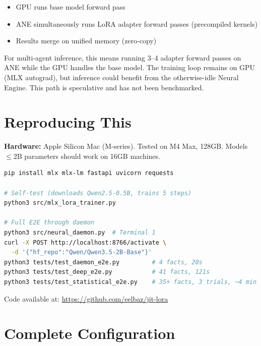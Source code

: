 \documentclass[11pt,a4paper]{article}
\begin{document}
\begin{itemize}[noitemsep]
    \item GPU runs base model forward pass
    \item ANE simultaneously runs LoRA adapter forward passes (precompiled kernels)
    \item Results merge on unified memory (zero-copy)
\end{itemize}

For multi-agent inference, this means running 3--4 adapter forward passes on ANE while the GPU handles the base model. The training loop remains on GPU (MLX autograd), but inference could benefit from the otherwise-idle Neural Engine. This path is speculative and has not been benchmarked.

\section{Reproducing This}

\textbf{Hardware:} Apple Silicon Mac (M-series). Tested on M4 Max, 128GB. Models $\leq$2B parameters should work on 16GB machines.

\begin{lstlisting}[language=bash, numbers=none]
pip install mlx mlx-lm fastapi uvicorn requests

# Self-test (downloads Qwen2.5-0.5B, trains 5 steps)
python3 src/mlx_lora_trainer.py

# Full E2E through daemon
python3 src/neural_daemon.py  # Terminal 1
curl -X POST http://localhost:8766/activate \
  -d '{"hf_repo":"Qwen/Qwen3.5-2B-Base"}'
python3 tests/test_daemon_e2e.py         # 4 facts, 20s
python3 tests/test_deep_e2e.py           # 41 facts, 121s
python3 tests/test_statistical_e2e.py    # 35+ facts, 3 trials, ~4 min
\end{lstlisting}

Code available at: \url{https://github.com/eelbaz/jit-lora}

\section{Complete Configuration}
\end{document}
